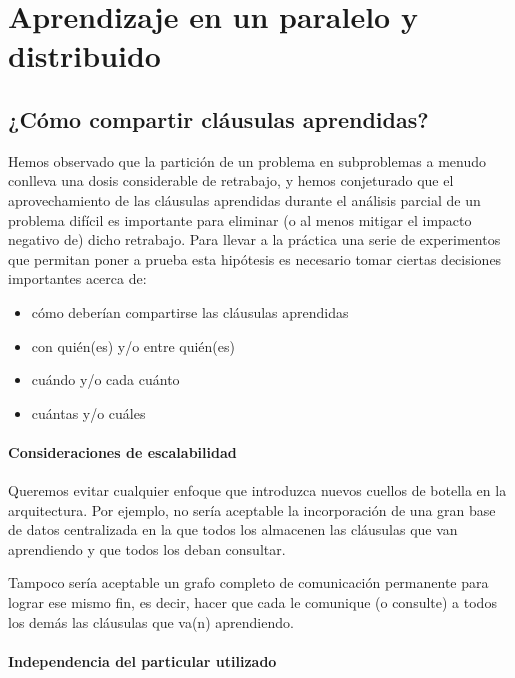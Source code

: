 \chapter{Aprendizaje en un \ssolver paralelo y distribuido}
\label{aprendizaje-pardist}


\section{¿Cómo compartir cláusulas aprendidas?}

Hemos observado que la partición de un problema en subproblemas a menudo conlleva una dosis considerable de retrabajo, y hemos conjeturado que el aprovechamiento de las cláusulas aprendidas durante el análisis parcial de un problema difícil es importante para eliminar (o al menos mitigar el impacto negativo de) dicho retrabajo. Para llevar a la práctica una serie de experimentos que permitan poner a prueba esta hipótesis es necesario tomar ciertas decisiones importantes acerca de:

\begin{itemize}
\item cómo deberían compartirse las cláusulas aprendidas
\item con quién(es) y/o entre quién(es)
\item cuándo y/o cada cuánto
\item cuántas y/o cuáles
\end{itemize}

\subsubsection{Consideraciones de escalabilidad}

Queremos evitar cualquier enfoque que introduzca nuevos cuellos de botella en la arquitectura. Por ejemplo, no sería aceptable la incorporación de una gran base de datos centralizada en la que todos los \ws almacenen las cláusulas que van aprendiendo y que todos los \ws deban consultar.

Tampoco sería aceptable un grafo completo de comunicación permanente para lograr ese mismo fin, es decir, hacer que cada \w le comunique (o consulte) a todos los demás las cláusulas que va(n) aprendiendo.


\subsubsection{Independencia del \ssolver particular utilizado}

